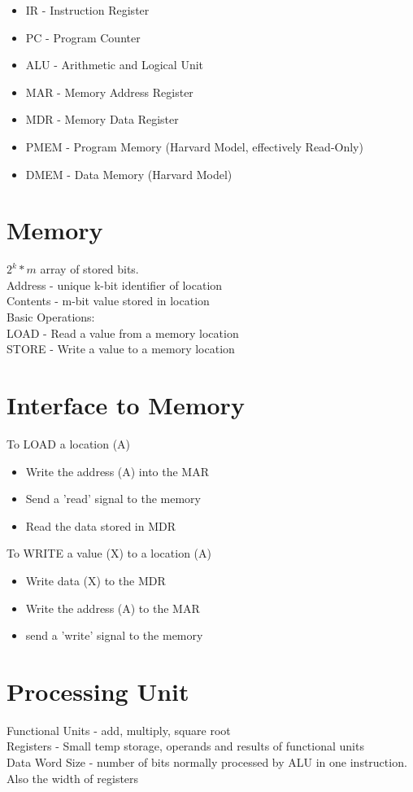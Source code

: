 \documentclass{article}
\begin{document}
\begin{itemize}
  \item IR - Instruction Register
  \item PC - Program Counter
  \item ALU - Arithmetic and Logical Unit
  \item MAR - Memory Address Register
  \item MDR - Memory Data Register
  \item PMEM - Program Memory (Harvard Model, effectively Read-Only)
  \item DMEM - Data Memory (Harvard Model)
\end{itemize}

\section{Memory}
$2^k * m$ array of stored bits.\\
Address - unique k-bit identifier of location\\
Contents - m-bit value stored in location\\

Basic Operations:\\
LOAD - Read a value from a memory location\\
STORE - Write a value to a memory location\\

\section{Interface to Memory}
To LOAD a location (A)
\begin{itemize}
  \item Write the address (A) into the MAR
  \item Send a 'read' signal to the memory
  \item Read the data stored in MDR
\end{itemize}

To WRITE a value (X) to a location (A)
\begin{itemize}
  \item Write data (X) to the MDR
  \item Write the address (A) to the MAR
  \item send a 'write' signal to the memory
\end{itemize}

\section{Processing Unit}
Functional Units - add, multiply, square root\\
Registers - Small temp storage, operands and results of functional units\\
Data Word Size - number of bits normally processed by ALU in one instruction. Also the width of registers\\
\end{document}
